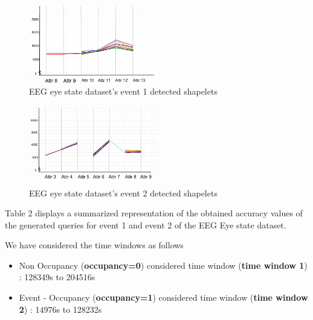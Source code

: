 \documentclass[letterpaper, 10 pt, conference]{IEEEtran}  %
\begin{document}
\begin{figure}[h!]
\includegraphics[width=0.5\textwidth]{EEG_event1.png}
\caption{EEG eye state dataset's event 1 detected shapelets}
\end{figure}

\begin{figure}[h!]
\includegraphics[width=0.5\textwidth]{EEG_event2.png}
\caption{EEG eye state dataset's event 2 detected shapelets}
\end{figure}

Table 2 displays a summarized representation of the obtained accuracy values of the generated queries for event 1 and event 2 of the EEG Eye state dataset.

We have considered the time windows as follows
\begin{itemize}
\item Non Occupancy (\textbf{occupancy=0}) considered time window (\textbf{time window 1}) : 128349s to 204516s
\item Event - Occupancy (\textbf{occupancy=1}) considered time window (\textbf{time window 2}) : 14976s to 128232s
\end{itemize}
\end{document}
